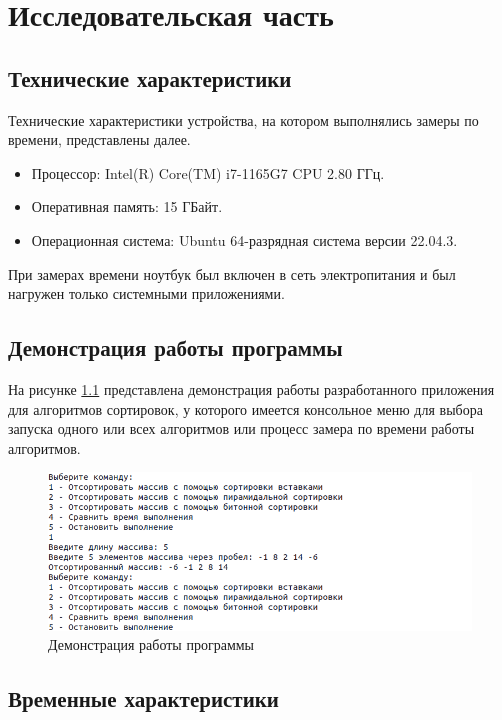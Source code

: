\chapter{Исследовательская часть}

\section{Технические характеристики}

Технические характеристики устройства, на котором выполнялись замеры по времени, представлены далее.

\begin{itemize}
	\item Процессор: Intel(R) Core(TM) i7-1165G7 CPU 2.80 ГГц.
	\item Оперативная память: 15 ГБайт.
	\item Операционная система: Ubuntu 64-разрядная система версии 22.04.3.
\end{itemize}

При замерах времени ноутбук был включен в сеть электропитания и был нагружен только системными приложениями.

\clearpage

\section{Демонстрация работы программы}

На рисунке \ref{img:demonstration} представлена демонстрация работы разработанного приложения для алгоритмов сортировок, у которого имеется консольное меню для выбора запуска одного или всех алгоритмов или процесс замера по времени работы алгоритмов.

\begin{figure}[h]
	\centering
	\includegraphics[height=0.35\textheight]{img/example.png}
	\caption{Демонстрация работы программы}
	\label{img:demonstration}
\end{figure}

\section{Временные характеристики}

